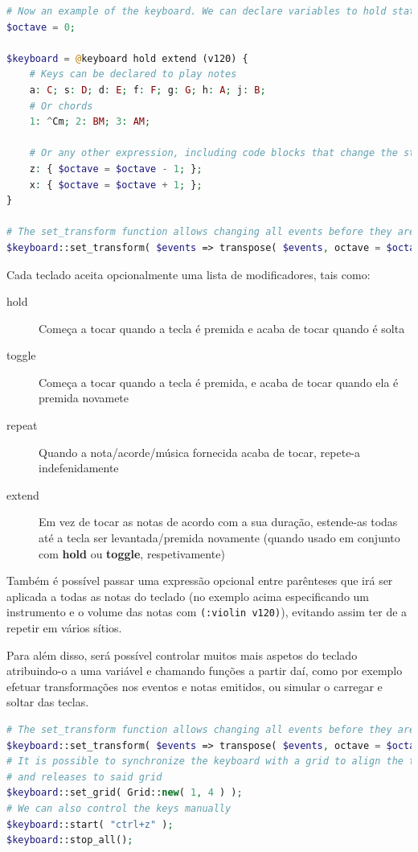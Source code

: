 \documentclass[
  oneside,
  11pt, a4paper,
  footinclude=true,
  headinclude=true,
  cleardoublepage=empty
]{scrbook}
\begin{document}
    
    \begin{lstlisting}[caption=Exemplo da sintaxe de teclados virtuais,language=PHP]
# Now an example of the keyboard. We can declare variables to hold state
$octave = 0;

$keyboard = @keyboard hold extend (v120) {
    # Keys can be declared to play notes
    a: C; s: D; d: E; f: F; g: G; h: A; j: B;
    # Or chords
    1: ^Cm; 2: BM; 3: AM;
        
    # Or any other expression, including code blocks that change the state
    z: { $octave = $octave - 1; };
    x: { $octave = $octave + 1; };
}

# The set_transform function allows changing all events before they are emitted by this keyboard
$keyboard::set_transform( $events => transpose( $events, octave = $octave ) );
    \end{lstlisting}

    Cada\label{modifiers} teclado aceita opcionalmente uma lista de modificadores, tais como:
    \begin{description}
     \item[hold] Começa a tocar quando a tecla é premida e acaba de tocar quando é solta
     \item[toggle] Começa a tocar quando a tecla é premida, e acaba de tocar quando ela é premida novamete
     \item[repeat] Quando a nota/acorde/música fornecida acaba de tocar, repete-a indefenidamente
     \item[extend] Em vez de tocar as notas de acordo com a sua duração, estende-as todas até a tecla ser levantada/premida novamente (quando usado em conjunto com \textbf{hold} ou \textbf{toggle}, respetivamente)
    \end{description}
    
    Também é possível passar uma expressão opcional entre parênteses que irá ser aplicada a todas as notas do teclado (no exemplo acima especificando um instrumento e o volume das notas com \texttt{(:violin v120)}), evitando assim ter de a repetir em vários sítios.
    
    Para além disso, será possível controlar muitos mais aspetos do teclado atribuindo-o a uma variável e chamando funções a partir daí, como por exemplo efetuar transformações nos eventos e notas emitidos, ou simular o carregar e soltar das teclas.

\begin{lstlisting}[caption=Exemplo da sintaxe proposta da linguagem,language=PHP]
# The set_transform function allows changing all events before they are emitted by this keyboard
$keyboard::set_transform( $events => transpose( $events, octave = $octave ) );
# It is possible to synchronize the keyboard with a grid to align the timings of key presses 
# and releases to said grid
$keyboard::set_grid( Grid::new( 1, 4 ) );
# We can also control the keys manually
$keyboard::start( "ctrl+z" );
$keyboard::stop_all();

\end{lstlisting}
    
\end{document}

